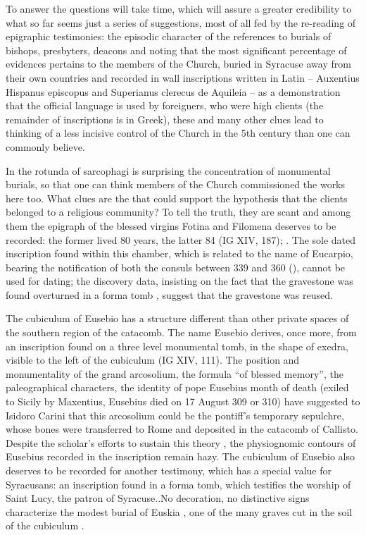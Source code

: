 \documentclass[amsthm,ebook]{saparticle}
\begin{document}
To answer the questions will take time, which will assure a greater credibility to what so far seems just a series of suggestions, most of all fed by the re-reading of epigraphic testimonies: the episodic character of the references to burials of bishops, presbyters, deacons and noting that the most significant percentage of evidences pertains to the members of the Church, buried in Syracuse away from their own countries and recorded in wall inscriptions written in Latin – Auxentius Hispanus episcopus and Superianus clerecus de Aquileia \citep[1 and 6]{FERRUA1940} – as a demonstration that the official language is used by foreigners, who were high clients (the remainder of inscriptions is in Greek), these and many other clues lead to thinking of a less incisive control of the Church in the 5th century than one can commonly believe.

In the rotunda of sarcophagi is surprising the concentration of monumental burials, so that one can think members of the Church commissioned the works here too. What clues are the that could support the hypothesis that the clients belonged to a religious community? To tell the truth, they are scant and among them the epigraph of the blessed virgins Fotina and Filomena deserves to be recorded: the former lived 80 years, the latter 84 (IG XIV, 187); \citep[180]{FERRUA 1989}. The sole dated inscription found within this chamber, which is related to the name of Eucarpio, bearing the notification of both the consuls between 339 and 360 (\citep[3]{FERRUA1983}), cannot be used for dating; the discovery data, insisting on the fact that the gravestone was found overturned in a forma tomb \citep[30-31]{AGNELLO1960}, suggest that the gravestone was reused.

The cubiculum of Eusebio has a structure different than other private spaces of the southern region of the catacomb. The name Eusebio derives, once more, from an inscription found on a three level monumental tomb, in the shape of exedra, visible to the left of the cubiculum (IG XIV, 111). The position and monumentality of the grand arcosolium, the formula ``of blessed memory'', the paleographical characters, the identity of pope Eusebius month of death (exiled to Sicily by Maxentius, Eusebius died on 17 August 309 or 310) have suggested to Isidoro Carini that this arcosolium could be the pontiff’s temporary sepulchre, whose bones were transferred to Rome and deposited in the catacomb of Callisto. Despite the scholar’s efforts to sustain this theory \citep[134]{CARINI1873}, the physiognomic contours of Eusebius recorded in the inscription remain hazy.
The cubiculum of Eusebio also deserves to be recorded for another testimony, which has a special value for Syracusans: an inscription found in a forma tomb, which testifies the worship of Saint Lucy, the patron of Syracuse..No decoration, no distinctive signs characterize the modest burial of Euskia \citep[299-308]{ORSI1895}, one of the many graves cut in the soil of the cubiculum \citep[526-528, fig. 164]{GUARDUCCI1978}.
\end{document}
